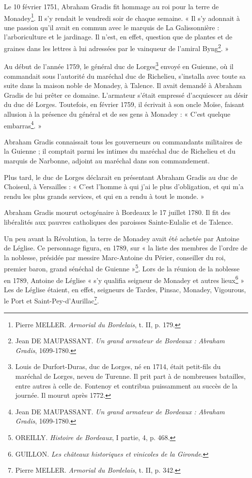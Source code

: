 Le 10 février 1751, Abraham Gradis fit hommage au roi pour la terre de Monadey\footnote{Pierre MELLER. \textit{Armorial du Bordelais}, t. II, p. 179.}. Il s'y rendait le vendredi soir de chaque semaine. « Il s'y adonnait à une passion qu'il avait en commun avec le marquis de La Galissonnière : l'arboriculture et le jardinage. Il n'est, en effet, question que de plantes et de graines dans les lettres à lui adressées par le vainqueur de l'amiral Byng\footnote{Jean DE MAUPASSANT. \textit{Un grand armateur de Bordeaux : Abraham Gradis}, 1699-1780.}. »

Au début de l'année 1759, le général duc de Lorges\footnote{Louis de Durfort-Duras, duc de Lorges, né en 1714, était petit-fils du maréchal de Lorges, neveu de Turenne. Il prit part à de nombreuses batailles, entre autres à celle de. Fontenoy et contribua puissamment au succès de la journée. Il mourut après 1772.} envoyé en Guienne, où il commandait sous l'autorité du maréchal duc de Richelieu, s'installa avec toute sa suite dans la maison noble de Monadey, à Talence. Il avait demandé à Abraham Gradis de lui prêter ce domaine. L'armateur s'était empressé d'acquiescer au désir du duc dé Lorges. Toutefois, en février 1759, il écrivait à son oncle Moïse, faisant allusion à la présence du général et de ses gens à Monadey : « C'est quelque embarras\footnote{Jean DE MAUPASSANT. \textit{Un grand armateur de Bordeaux : Abraham Gradis}, 1699-1780.}. »

Abraham Gradis connaissait tous les gouverneurs ou commandants militaires de la Guienne ; il comptait parmi les intimes du maréchal duc de Richelieu et du marquis de Narbonne, adjoint au maréchal dans son commandement.

Plus tard, le duc de Lorges déclarait en présentant Abraham Gradis au duc de Choiseul, à Versailles : « C'est l'homme à qui j'ai le plus d'obligation, et qui m'a rendu les plus grands services, et qui en a rendu à tout le monde. »

Abraham Gradis mourut octogénaire à Bordeaux le 17 juillet 1780. Il fit des libéralités aux pauvres catholiques des paroisses Sainte-Eulalie et de Talence.

Un peu avant la Révolution, la terre de Monadey avait été achetée par Antoine de Léglise. Ce personnage figura, en 1789, sur « la liste des membres de l'ordre de la noblesse, présidée par messire Marc-Antoine du Périer, conseiller du roi, premier baron, grand sénéchal de Guienne »\footnote{OREILLY. \textit{Histoire de Bordeaux}, I\iere{} partie, 4, p. 468.}. Lors de la réunion de la noblesse en 1789, Antoine de Léglise « s'y qualifia seigneur de Monadey et autres lieux\footnote{GUILLON. \textit{Les châteaux historiques et vinicoles de la Gironde}.} » Les de Léglise étaient, en effet, seigneurs de Tardes, Pinsac, Monadey, Vigourous, le Port et Saint-Pey-d'Aurillac\footnote{Pierre MELLER. \textit{Armorial du Bordelais}, t. II, p. 342.}.

